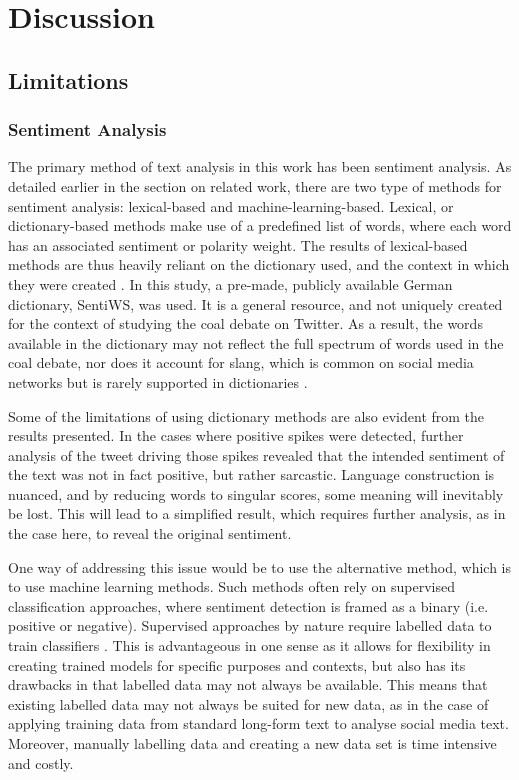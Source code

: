 \documentclass[12pt,onecolumn,twoside]{layout}
\begin{document}
\section*{Discussion} \label{sec:discussion}
\subsection*{Limitations}
\subsubsection*{Sentiment Analysis} 
The primary method of text analysis in this work has been sentiment analysis. As detailed earlier in the section on related work, there are two type of methods for sentiment analysis: lexical-based and machine-learning-based. Lexical, or dictionary-based methods make use of a predefined list of words, where each word has an associated sentiment or polarity weight. The results of lexical-based methods are thus heavily reliant on the dictionary used, and the context in which they were created \cite{Goncalves2013}. In this study, a pre-made, publicly available German dictionary, SentiWS, was used. It is a general resource, and not uniquely created for the context of studying the coal debate on Twitter. As a result, the words available in the dictionary may not reflect the full spectrum of words used in the coal debate, nor does it account for slang, which is common on social media networks but is rarely supported in dictionaries \cite{Hu2013}. 

Some of the limitations of using dictionary methods are also evident from the results presented. In the cases where positive spikes were detected, further analysis of the tweet driving those spikes revealed that the intended sentiment of the text was not in fact positive, but rather sarcastic. Language construction is nuanced, and by reducing words to singular scores, some meaning will inevitably be lost. This will lead to a simplified result, which requires further analysis, as in the case here, to reveal the original sentiment. 

One way of addressing this issue would be to use the alternative method, which is to use machine learning methods. Such methods often rely on supervised classification approaches, where sentiment detection is framed as a binary (i.e. positive or negative). Supervised approaches by nature require labelled data to train classifiers \cite{Pang2002}. This is advantageous in one sense as it allows for flexibility in creating trained models for specific purposes and contexts, but also has its drawbacks in that labelled data may not always be available. This means that existing labelled data may not always be suited for new data, as in the case of applying training data from standard long-form text to analyse social media text. Moreover, manually labelling data and creating a new data set is time intensive and costly. 
\end{document}
